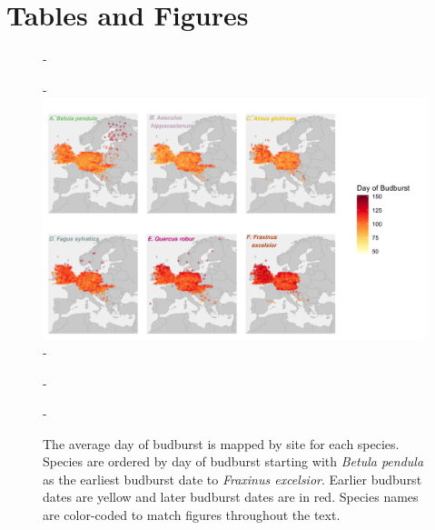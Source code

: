 \documentclass{article}\usepackage[]{graphicx}\usepackage[]{color}
\begin{document}


\section*{Tables and Figures} 

{\begin{figure} [H]
  -\begin{center}
  -\includegraphics[width=14cm]{..//analyses/figures/BB_base.png}
  -\caption{The average day of budburst is mapped by site for each species. Species are ordered by day of budburst starting with \textit{Betula pendula} as the earliest budburst date to \textit{Fraxinus excelsior}. Earlier budburst dates are yellow and later budburst dates are in red. Species names are color-coded to match figures throughout the text. }\label{fig:bbmap}
  -\end{center}
  -\end{figure}}
  
\end{document}
